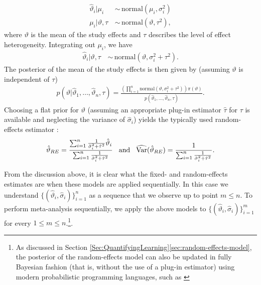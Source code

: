 \begin{align}\nonumber
    \hat \vartheta_i \lvert \mu_i\, & \sim \,\text{normal}(\mu_i , \sigma^2_i) \\\nonumber
    \mu_i \lvert \vartheta,\tau \, & \sim \,\text{normal}(\vartheta,\tau^2), 
\end{align}
where $\vartheta$ is the mean of the study effects and $\tau$ describes the level of effect heterogeneity.
Integrating out $\mu_i$, we have 
\begin{align}\nonumber
    \hat \vartheta_i \lvert \vartheta, \tau \, & \sim \,\text{normal}(\vartheta, \sigma_i^2+\tau^2). 
\end{align}
The posterior of the mean of the study effects is then given by (assuming $\vartheta$ is independent of $\tau$)
\begin{align}\nonumber
     p(\vartheta \lvert \hat \vartheta_1, \dots , \hat \vartheta_n,\tau) = \frac{\left(\prod_{i=1}^n \text{normal}(\vartheta, \sigma_i^2+\tau^2)\right) \pi(\vartheta)}{p(\hat \vartheta_1, \dots , \hat \vartheta_n,\tau)}.
\end{align}
Choosing a flat prior for $\vartheta$ (assuming an appropriate plug-in estimator $\hat \tau$ for $\tau$ is available and neglecting the variance of $\hat \sigma_i$) yields the typically used random-effects estimator \citep{Whitehead_Whitehead_1991,Higgins_Thompson_Spiegelhalter_2009}:
\begin{align}
\label{eq:REest}
    \hat \vartheta_{RE} = \frac{\sum_{i=1}^n\frac{1}{\hat\sigma_i^2 + \hat \tau^2 }\hat \vartheta_i}{\sum_{i=1}^n\frac{1}{\hat\sigma_i^2 + \hat \tau^2 }} \hspace{0.3cm} \text{and}\hspace{0.3cm} 
   \widehat{\text{Var}} (\hat \vartheta_{RE}) = \frac{1}{\sum_{i=1}^n\frac{1}{\hat\sigma_i^2 + \hat \tau^2 }}.
\end{align}

From the discussion above, it is clear what the fixed- and random-effects estimates are when these models are applied sequentially. In this case we understand $\{(\hat \vartheta_i,\hat \sigma_i)\}_{i=1}^n$ as a sequence that we observe up to point  $m \leq n$. To perform meta-analysis sequentially, we apply the above models to $\{(\hat \vartheta_i,\hat \sigma_i)\}_{i=1}^m$ for every $1\leq m \leq n$.\footnote{As discussed in Section \ref{Sec:QuantifyingLearning}\ref{sec:random-effects-model}, the posterior of the random-effects model can also be updated in fully Bayesian fashion (that is, without the use of a plug-in estimator) using modern probabilistic programming languages, such as \citep{stan}}.

